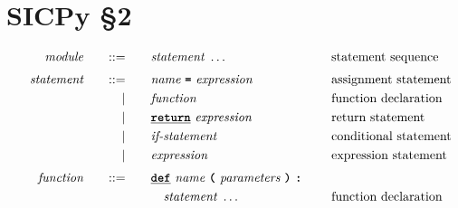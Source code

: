 \section*{SICPy \S2}

\begin{alignat*}{9}
&& \textit{module}    &&\quad ::= &\quad && \textit{statement} \ \ldots
                                                           && \textrm{{statement sequence}} \\[1mm]
&& \textit{statement}    &&\quad ::= &\quad && \textit{name} \ \textbf{\texttt{=}}\  \textit{expression} \
                                                           && \textrm{assignment statement} \\
&&                       && |   &\quad && \textit{function} \quad
                                                           && \textrm{function declaration}\\
&&                       && |   &\quad && \textbf{\texttt{\underline{return}}}\  \textit{expression} \
                                                           && \textrm{return statement}\\
&&                       && |   &\quad && \textit{if-statement} \quad
                                                           && \textrm{conditional statement}\\
&&                       && |   &\quad &&  \textit{expression} \ 
                                                           && \textrm{expression statement} \\[1mm]
&& \textit{function} && ::=&\quad && \textbf{\texttt{\underline{def}}}\  \textit{name} \ 
                                   \textbf{\texttt{(}}\  \textit{parameters} \ \textbf{\texttt{)}} \
                                   \textbf{\texttt{:}} \ \quad
                                                           && \\         
&&                       &&     &\quad && \quad \textit{statement} \ \ldots \quad
                                                           && \textrm{function declaration}\\                                                           

\end{alignat*}
